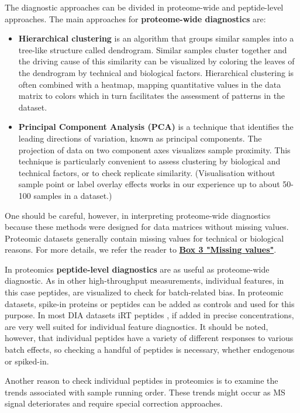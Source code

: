 \documentclass[num-refs]{wiley-article}
\begin{document}
The diagnostic approaches can be divided in proteome-wide and peptide-level approaches. The main approaches for \textbf{proteome-wide diagnostics} are:
\begin{itemize}
	\item \textbf{Hierarchical clustering} is an algorithm that groups similar samples into a tree-like structure called dendrogram. Similar samples cluster together and the driving cause of this similarity can be visualized by coloring the leaves of the dendrogram by technical and biological factors. Hierarchical clustering is often combined with a heatmap, mapping quantitative values in the data matrix to colors which in turn facilitates the assessment of patterns in the dataset.
	\item \textbf{Principal Component Analysis (PCA)} is a technique that identifies the leading directions of variation, known as principal components. The projection of data on two component axes visualizes sample proximity. This technique is particularly convenient to assess clustering by biological and technical factors, or to check replicate similarity. (Visualisation without sample point or label overlay effects works in our experience up to about 50-100 samples in a dataset.)
\end{itemize}

One should be careful, however, in interpreting proteome-wide diagnostics because these methods were designed for data matrices without missing values. Proteomic datasets generally contain missing values for technical or biological reasons. For more details, we refer the reader to \textbf{\hyperref[box:Box3_missingness]{Box 3 "Missing values"}}.



In proteomics \textbf{peptide-level diagnostics} are as useful as proteome-wide diagnostic. As in other high-throughput measurements, individual features, in this case peptides, are visualized to check for batch-related bias. In proteomic datasets, spike-in proteins or peptides can be added as controls and used for this purpose. In most DIA datasets iRT peptides \cite{Escher:2012aa}, if added in precise concentrations, are very well suited for individual feature diagnostics.
It should be noted, however, that individual peptides have a variety of different responses to various batch effects, so checking a handful of peptides is necessary, whether endogenous or spiked-in.

Another reason to check individual peptides in proteomics is to examine the trends associated with sample running order. These trends might occur as MS signal deteriorates and require special correction approaches.
\end{document}
